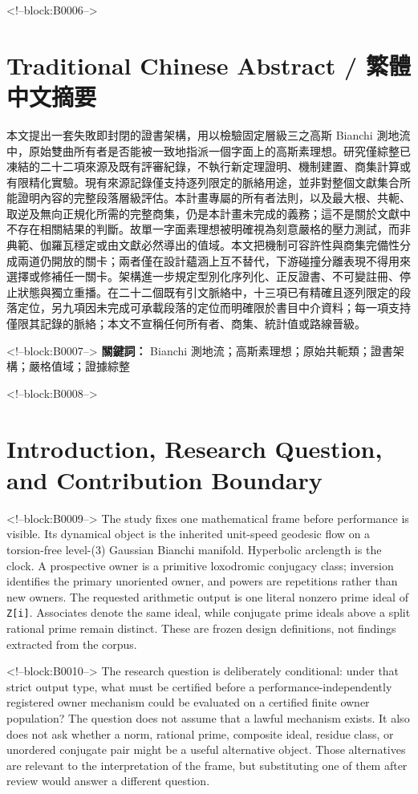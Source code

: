 \documentclass[11pt,a4paper]{article}
\begin{document}
<!--block:B0006-->
\begin{otherlanguage}{chinese-traditional}
\section*{Traditional Chinese Abstract / 繁體中文摘要}
本文提出一套失敗即封閉的證書架構，用以檢驗固定層級三之高斯 Bianchi 測地流中，原始雙曲所有者是否能被一致地指派一個字面上的高斯素理想。研究僅綜整已凍結的二十二項來源及既有評審紀錄，不執行新定理證明、機制建置、商集計算或有限精化實驗。現有來源記錄僅支持逐列限定的脈絡用途，並非對整個文獻集合所能證明內容的完整段落層級評估。本計畫專屬的所有者法則，以及最大根、共軛、取逆及無向正規化所需的完整商集，仍是本計畫未完成的義務；這不是關於文獻中不存在相關結果的判斷。故單一字面素理想被明確視為刻意嚴格的壓力測試，而非典範、伽羅瓦穩定或由文獻必然導出的值域。本文把機制可容許性與商集完備性分成兩道仍開放的關卡；兩者僅在設計蘊涵上互不替代，下游碰撞分離表現不得用來選擇或修補任一關卡。架構進一步規定型別化序列化、正反證書、不可變註冊、停止狀態與獨立重播。在二十二個既有引文脈絡中，十三項已有精確且逐列限定的段落定位，另九項因未完成可承載段落的定位而明確限於書目中介資料；每一項支持僅限其記錄的脈絡；本文不宣稱任何所有者、商集、統計值或路線晉級。

<!--block:B0007-->
\noindent\textbf{關鍵詞：} Bianchi 測地流；高斯素理想；原始共軛類；證書架構；嚴格值域；證據綜整
\end{otherlanguage}

<!--block:B0008-->
\section{Introduction, Research Question, and Contribution Boundary}

<!--block:B0009-->
The study fixes one mathematical frame before performance is visible. Its dynamical object is the inherited unit-speed geodesic flow on a torsion-free level-(3) Gaussian Bianchi manifold. Hyperbolic arclength is the clock. A prospective owner is a primitive loxodromic conjugacy class; inversion identifies the primary unoriented owner, and powers are repetitions rather than new owners. The requested arithmetic output is one literal nonzero prime ideal of \texttt{Z{[}i{]}}. Associates denote the same ideal, while conjugate prime ideals above a split rational prime remain distinct. These are frozen design definitions, not findings extracted from the corpus.

<!--block:B0010-->
The research question is deliberately conditional: under that strict output type, what must be certified before a performance-independently registered owner mechanism could be evaluated on a certified finite owner population? The question does not assume that a lawful mechanism exists. It also does not ask whether a norm, rational prime, composite ideal, residue class, or unordered conjugate pair might be a useful alternative object. Those alternatives are relevant to the interpretation of the frame, but substituting one of them after review would answer a different question.
\end{document}
